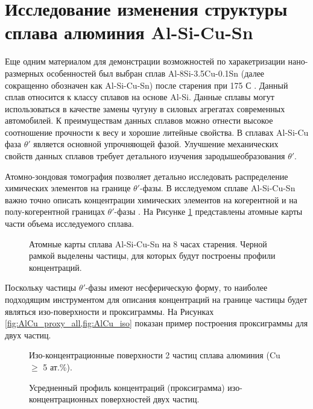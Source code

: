 \FloatBarrier

\section{Исследование изменения структуры сплава алюминия Al-Si-Cu-Sn}\label{sec:ch4/sect4}


Еще одним материалом для демонстрации возможностей по харакетризации нано-размерных особенностей был выбран сплав Al-8Si-3.5Cu-0.1Sn (далее сокращенно обозначен как Al-Si-Cu-Sn) после старения при 175 \textdegree С \cite{Akopyan2022A319}. Данный сплав относится к классу сплавов на основе Al-Si. Данные сплавы могут использоваться в качестве замены чугуну в силовых агрегатах современных автомобилей. К преимуществам данных сплавов можно отнести высокое соотношение прочности к весу и хорошие литейные свойства. В сплавах Al-Si-Cu фаза $\theta '$ является основной упрочняющей фазой. Улучшение механических свойств данных сплавов требует детального изучения зародышеобразования $\theta '$. 

Атомно-зондовая томография позволяет детально исследовать распределение химических элементов на границе $\theta '$-фазы. В исследуемом сплаве Al-Si-Cu-Sn важно точно описать концентрации химических элементов на когерентной и на полу-когерентной границах  $\theta '$-фазы \cite{Akopyan2022A319}. На Рисунке \cref{fig:AlCu_atom_maps} представлены атомные карты части объема исследуемого сплава.

\begin{figure}[htb]
	\caption{Атомные карты сплава Al-Si-Cu-Sn на 8 часах старения. Черной рамкой выделены частицы, для которых будут построены профили концентраций.}
	\label{fig:AlCu_atom_maps}
\end{figure}


Поскольку частицы $\theta '$-фазы имеют несферическую форму, то наиболее подходящим инструментом для описания концентраций на границе частицы будет являться изо-поверхности и проксиграммы. На Рисунках \cref{fig:AlCu_proxy_all,fig:AlCu_iso} показан пример построения проксиграммы для двух частиц.

\begin{figure}[htb]
	\caption{Изо-концентрационные поверхности 2 частиц сплава алюминия (Cu $\geq$ 5 ат.\%).}
	\label{fig:AlCu_iso}
\end{figure}


\begin{figure}[htb]
	\caption{Усредненный профиль концентраций (проксиграмма) изо-концентрационных поверхностей двух частиц.}
	\label{fig:AlCu_proxy_all}
\end{figure}

